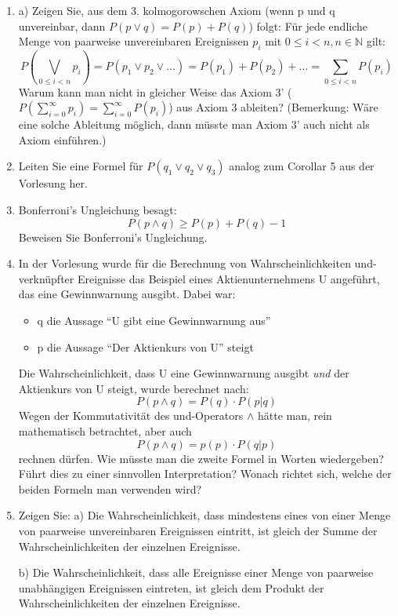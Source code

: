 \begin{enumerate}
\item a) Zeigen Sie, aus dem 3. kolmogorowschen Axiom (wenn p und q unvereinbar,
dann $P(p \vee q) = P(p) + P(q)$) folgt: Für jede endliche Menge von paarweise
unvereinbaren Ereignissen $p_i$ mit $0 \leq i < n, n \in \mathbb{N}$ gilt:
\[P(\bigvee_{0 \leq i < n} p_i) = 
P(p_1 \vee p_2 \vee \ldots) = 
P(p_1) + P(p_2) + \ldots = 
\sum_{0 \leq i < n} P(p_i)\]
Warum kann man nicht in gleicher Weise das Axiom 3' ($P(\sum_{i=0}^{\infty} p_i)
= \sum_{i=0}^{\infty} P(p_i)$) aus Axiom 3 ableiten? (Bemerkung: Wäre eine
solche Ableitung möglich, dann müsste man Axiom 3' auch nicht als Axiom einführen.)

\item\label{beweis3} Leiten Sie eine Formel für $P(q_1 \vee q_2 \vee q_3)$
analog zum Corollar 5 aus der Vorlesung her.

\item Bonferroni's Ungleichung besagt:
\[P(p \wedge q) \geq P(p) + P(q) - 1\]
Beweisen Sie Bonferroni's Ungleichung.

\item In der Vorlesung wurde für die Berechnung von
Wahrscheinlichkeiten und-verknüpfter Ereignisse das Beispiel eines
Aktienunternehmens U angeführt, das eine Gewinnwarnung ausgibt. Dabei war:
\begin{itemize}
  \item q die Aussage "`U gibt eine Gewinnwarnung aus"'
  \item p die Aussage "`Der Aktienkurs von U"' steigt  
\end{itemize}
Die Wahrscheinlichkeit, dass U eine Gewinnwarnung ausgibt {\em und} der
Aktienkurs von U steigt, wurde berechnet nach:
\[ P(p \wedge q) = P(q) \cdot P(p|q) \]
Wegen der Kommutativität des und-Operators $\wedge$ hätte man, rein
mathematisch betrachtet, aber auch
\[ P(p \wedge q) = p(p) \cdot P(q|p) \]
rechnen dürfen. Wie müsste man die zweite Formel in Worten wiedergeben? Führt
dies zu einer sinnvollen Interpretation? Wonach richtet sich, welche der
beiden Formeln man verwenden wird?

\item Zeigen Sie: a) Die Wahrscheinlichkeit, dass mindestens eines von
einer Menge von paarweise unvereinbaren Ereignissen eintritt, ist gleich der
Summe der Wahrscheinlichkeiten der einzelnen Ereignisse. 

b) Die Wahrscheinlichkeit, dass alle Ereignisse einer Menge von paarweise
unabhängigen Ereignissen eintreten, ist gleich dem Produkt der
Wahrscheinlichkeiten der einzelnen Ereignisse.


\end{enumerate}
